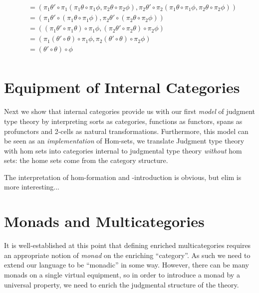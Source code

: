 \documentclass{article}
\begin{document}
\begin{definition}
\begin{enumerate}
\begin{align*}
      &= (\pi_1 \theta' \circ \pi_1(\pi_1 \theta \circ \pi_1 \phi, \pi_2 \theta \circ \pi_2 \phi),
      \pi_2 \theta' \circ \pi_2(\pi_1 \theta \circ \pi_1 \phi, \pi_2 \theta \circ \pi_2 \phi))\\
      &= (\pi_1 \theta' \circ (\pi_1 \theta \circ \pi_1 \phi), \pi_2 \theta' \circ (\pi_2 \theta \circ \pi_2 \phi))\\
      &= ((\pi_1 \theta' \circ \pi_1 \theta) \circ \pi_1 \phi, (\pi_2 \theta' \circ \pi_2 \theta) \circ \pi_2 \phi)\\
      &= (\pi_1(\theta' \circ \theta) \circ \pi_1 \phi, \pi_2(\theta' \circ \theta) \circ \pi_2 \phi)\\
      &= (\theta' \circ \theta) \circ \phi \\
    \end{align*}
  \end{enumerate}
\end{definition}

\section{Equipment of Internal Categories}

Next we show that internal categories provide us with our first
\emph{model} of judgment type theory by interpreting sorts as
categories, functions as functors, spans as profunctors and 2-cells as
natural transformations.
%
Furthermore, this model can be seen as an \emph{implementation} of
Hom-sets, we translate Judgment type theory with hom sets into
categories internal to judgmental type theory \emph{without} hom sets:
the home sets come from the category structure.

The interpretation of hom-formation and -introduction is obvious, but
elim is more interesting...

\section{Monads and Multicategories}

It is well-established at this point that defining enriched
multicategories requires an appropriate notion of \emph{monad} on the
enriching ``category''. As such we need to extend our language to be
``monadic'' in some way.
However, there can be many monads on a single virtual equipment, so in
order to introduce a monad by a universal property, we need to enrich
the judgmental structure of the theory.
\end{document}

